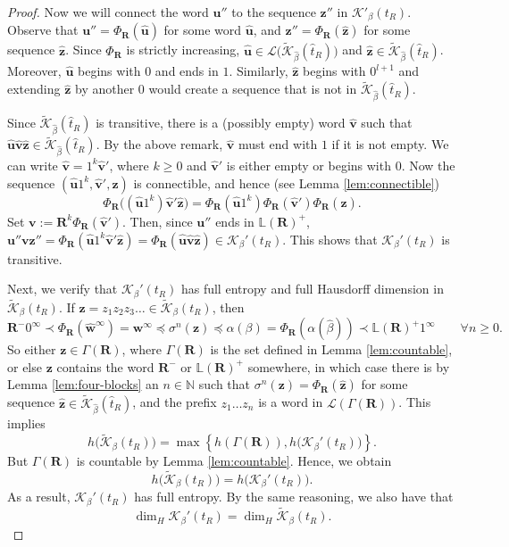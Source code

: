\documentclass[11pt]{amsart}
\theoremstyle{definition}
\theoremstyle{remark}
\numberwithin{equation}{section}
\newcommand{\N}{\ensuremath{\mathbb{N}}}
\renewcommand{\L}{\ensuremath{\mathbb{L}}}
\newcommand{\Kt}{\widetilde{\mathcal{K}}}
\newcommand{\bR}{\mathbf{R}}
\newcommand{\cL}{\mathcal{L}}
\renewcommand{\u}{\mathbf{u}}
\renewcommand{\v}{\mathbf{v}}
\newcommand{\w}{\mathbf{w}}
\newcommand{\z}{\mathbf{z}}
\newcommand{\Ga}{\Gamma}
\newcommand{\f}{\infty}
\newcommand{\al}{\alpha}
\newcommand{\lle}{\preccurlyeq}
\begin{document}
\begin{proof}
Now we will connect the word $\u''$ to the sequence $\z''$ {in $\mathcal{K}'_\beta(t_R)$}. Observe that $\u''=\Phi_\bR(\hat{\u})$ for some word $\hat{\u}$, and $\z''=\Phi_\bR(\hat{\z})$ for some sequence $\hat{\z}$. Since $\Phi_\bR$ is strictly increasing, $\hat{\u}\in \cL\big(\Kt_{\hat\beta}(\hat{t}_R)\big)$ and $\hat{\z}\in {\Kt_{\hat\beta}(\hat{t}_R)}$. Moreover, $\hat{\u}$ begins with $0$ and ends in $1$. Similarly, $\hat{\z}$ begins with $0^{l+1}$ and extending $\hat{\z}$ by another 0 would create a sequence that is not in $\Kt_{\hat\beta}(\hat{t}_R)$.

Since $\Kt_{\hat\beta}(\hat{t}_R)$ is transitive, there is a (possibly empty) word $\hat{\v}$ such that $\hat{\u}\hat{\v}\hat{\z}\in \Kt_{\hat\beta}(\hat{t}_R)$. By the above remark, $\hat{\v}$ must end with $1$ {if it is not empty}. We can write $\hat{\v}=1^k \hat{\v}'$, where $k\geq 0$ and $\hat{\v}'$ is either empty or begins with $0$. Now the sequence $(\hat{\u}1^k,\hat{\v}',\hat{\z})$ is connectible, and hence (see Lemma \ref{lem:connectible})
\[
\Phi_\bR\big((\hat{\u}1^k)\hat{\v}'\hat{\z}\big)=\Phi_\bR(\hat{\u}1^k)\Phi_\bR(\hat{\v}')\Phi_\bR(\hat{\z}).
\]
Set $\v:=\bR^k\Phi_\bR(\hat{\v}')$. Then, {since $\u''$ ends in $\L(\bR)^+$,} $\u''\v\z''=\Phi_\bR(\hat{\u}1^k\hat{\v}'\hat{\z})=\Phi_\bR(\hat{\u}\hat{\v}\hat{\z})\in \mathcal{K}_\beta'(t_R)$. This shows that $\mathcal{K}_\beta'(t_R)$ is transitive.

Next, we verify that $\mathcal{K}_\beta'(t_R)$ has full entropy and full Hausdorff dimension in $\Kt_\beta(t_R)$. If $\z=z_1z_2z_3\dots\in\Kt_\beta(t_R)$, then
\[
\bR^-0^\f\prec \Phi_\bR(\hat{\w}^\f)=\w^\f\lle\sigma^n(\z)\lle \alpha(\beta)=\Phi_\bR(\al(\hat{\beta}))\prec \L(\bR)^+1^\f \qquad\forall n\geq 0.
\]
So either $\z\in\Ga(\bR)$, where $\Ga(\bR)$ is the set defined in Lemma \ref{lem:countable}, or else $\z$ contains the word $\bR^-$ or $\L(\bR)^+$ somewhere, in which case there is by Lemma \ref{lem:four-blocks} an $n\in\N$ such that $\sigma^n(\z)=\Phi_\bR(\hat{\z})$ for some sequence $\hat{\z}\in\Kt_{\hat\beta}(\hat{t}_R)$, and the prefix $z_1\dots z_n$ is a word in $\cL(\Ga(\bR))$. %
This implies
\[
h\big(\Kt_\beta(t_R)\big)=\max\left\{h(\Ga(\bR)),h\big(\mathcal{K}_{\beta}'(t_R)\big)\right\}.
\]
But $\Ga(\bR)$ is countable by Lemma \ref{lem:countable}. Hence, we obtain
\begin{equation*}
h\big(\Kt_\beta(t_R)\big)=h\big(\mathcal{K}_{\beta}'(t_R)\big).
\end{equation*}
As a result, $\mathcal{K}_\beta'(t_R)$ has full entropy. By the same reasoning, we also have that
\[
\dim_H \mathcal{K}_\beta'(t_R)=\dim_H \Kt_\beta(t_R).
\]


\end{proof}
\end{document}
